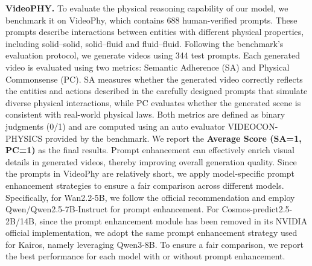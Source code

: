 \documentclass{llmxive}
\begin{document}
\textbf{VideoPHY.} To evaluate the physical reasoning capability of our model, we benchmark it on VideoPhy, which contains 688 human-verified prompts. These prompts describe interactions between entities with different physical properties, including solid–solid, solid–fluid and fluid–fluid. Following the benchmark’s evaluation protocol, we generate videos using 344 test prompts. Each generated video is evaluated using two metrics: Semantic Adherence (SA) and Physical Commonsense (PC). SA measures whether the generated video correctly reflects the entities and actions described in the carefully designed prompts that simulate diverse physical interactions, while PC evaluates whether the generated scene is consistent with real-world physical laws. Both metrics are defined as binary judgments (0/1) and are computed using an auto evaluator VIDEOCON-PHYSICS provided by the benchmark. We report the \textbf{Average Score (SA=1, PC=1)} as the final results. Prompt enhancement can effectively enrich visual details in generated videos, thereby improving overall generation quality. Since the prompts in VideoPhy are relatively short, we apply model-specific prompt enhancement strategies to ensure a fair comparison across different models. Specifically, for Wan2.2-5B, we follow the official recommendation and employ Qwen/Qwen2.5-7B-Instruct for prompt enhancement. For Cosmos-predict2.5-2B/14B, since the prompt enhancement module has been removed in its NVIDIA official implementation, we adopt the same prompt enhancement strategy used for Kairos, namely leveraging Qwen3-8B. To ensure a fair comparison, we report the best performance for each model with or without prompt enhancement.

\begin{table}[!htbp]
\centering
{}
\caption{Evaluation on VideoPhy. The highest score is \textbf{bolded}.}
\label{tab:videophy}
\end{table}
\end{document}
